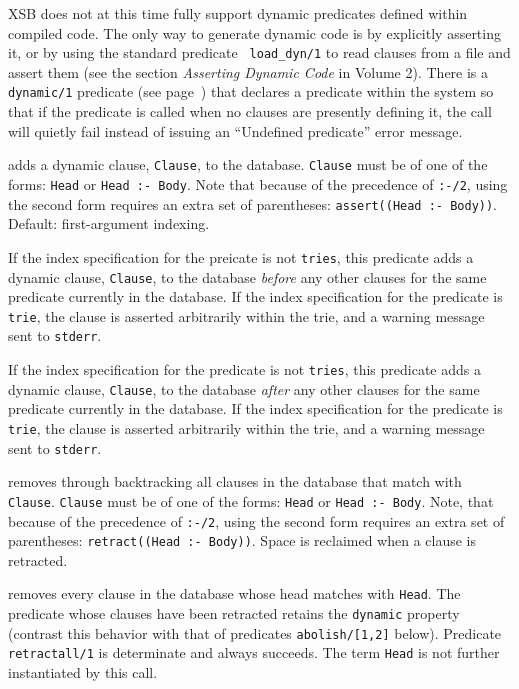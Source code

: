 XSB does not at this time fully support dynamic predicates defined
within compiled code.  The only way to generate dynamic code is by
explicitly asserting it, or by using the standard predicate {\tt
load\_dyn/1} to read clauses from a file and assert them (see
the section {\it Asserting Dynamic Code} in Volume 2).  There is a
{\tt dynamic/1} predicate (see 
page~\pageref{dynamic/1}) that declares a predicate within the system
so that if the predicate is called when no clauses are presently
defining it, the call will quietly fail instead of issuing an {\sf
``Undefined predicate''} error message.

\begin{description}

adds a dynamic clause, {\tt Clause}, to the database. {\tt Clause}
must be of one of the forms: {\tt Head} or {\tt Head :- Body}. Note
that because of the precedence of {\tt :-/2}, using the second form
requires an extra set of parentheses: {\tt assert((Head :- Body))}.
Default: first-argument indexing.

If the index specification for the preicate is not {\tt tries}, this
predicate adds a dynamic clause, {\tt Clause}, to the database {\em
before} any other clauses for the same predicate currently in the
database.  If the index specification for the predicate is {\tt trie},
the clause is asserted arbitrarily within the trie, and a warning
message sent to {\tt stderr}.


If the index specification for the predicate is not {\tt tries}, this
predicate adds a dynamic clause, {\tt Clause}, to the database {\em
after} any other clauses for the same predicate currently in the
database.  If the index specification for the predicate is {\tt trie},
the clause is asserted arbitrarily within the trie, and a warning
message sent to {\tt stderr}.

removes through backtracking all clauses in the database that match with
{\tt Clause}.  {\tt Clause} must be of one of the forms:  {\tt Head} or
{\tt Head :- Body}.  Note, that because of the precedence of {\tt :-/2},
using the second form requires an extra set of parentheses:
{\tt retract((Head :- Body))}.  Space is reclaimed when a 
clause is retracted.

removes every clause in the database whose head matches with {\tt Head}.
The predicate whose clauses have been retracted retains the {\tt dynamic}
property (contrast this behavior with that of predicates 
{\tt abolish/[1,2]} below).
Predicate {\tt retractall/1} is determinate and always succeeds.
The term {\tt Head} is not further instantiated by this call.


\end{description}
